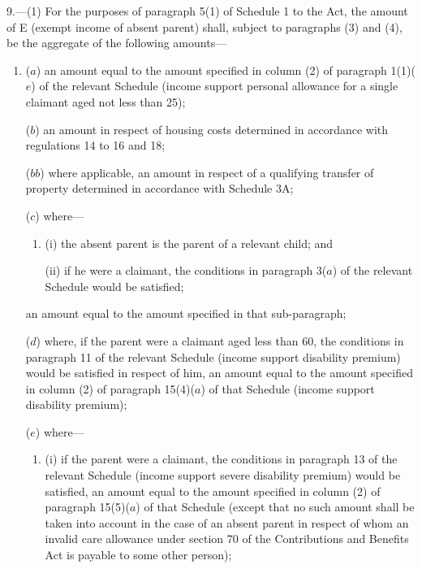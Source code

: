 \documentclass[a4paper]{article}
\begin{document}
9.—(1) For the purposes of paragraph 5(1) of Schedule 1 to the Act, the amount of E (exempt income of absent parent) shall, subject to paragraphs (3) and (4), be the aggregate of the following amounts—
\begin{enumerate}\item[]
($a$) an amount equal to the amount specified in column (2) of paragraph 1(1)($e$) of the relevant Schedule (income support personal allowance for a single claimant aged not less than 25);

($b$) an amount in respect of housing costs determined in accordance with regulations 14 to 
16 and 18;  %

($bb$) where applicable, an amount in respect of a qualifying transfer of property determined in accordance with Schedule 3A;

($c$) where—
\begin{enumerate}\item[]
(i) the absent parent is the parent of a relevant child; and


(ii) if he were a claimant, the conditions in paragraph 3($a$) of the relevant Schedule would be satisfied;
\end{enumerate}
an amount equal to the amount specified in 
that sub-paragraph;  %

($d$) where, if the parent were a claimant aged less than 60, the conditions in paragraph 11 of the relevant Schedule (income support disability premium) would be satisfied in respect of him, an amount equal to the amount specified in column (2) of paragraph 15(4)($a$) of that Schedule (income support disability premium);

($e$) where—
\begin{enumerate}\item[]
(i) if the parent were a claimant, the conditions in paragraph 13 of the relevant Schedule (income support severe disability premium) would be satisfied, an amount equal to the amount specified in column (2) of paragraph 15(5)($a$) of that Schedule (except that no such amount shall be taken into account in the case of an absent parent in respect of whom an invalid care allowance under section 70 of the Contributions and Benefits Act is payable to some other person);


\end{enumerate}
\end{enumerate}
\end{document}
